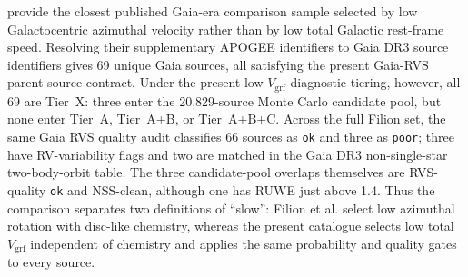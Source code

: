 \documentclass{aa}  %
\newcommand{\vgrf}{\ensuremath{V_{\mathrm{grf}}}\xspace}
\begin{document}
\citet{Filion2025} provide the closest published Gaia-era comparison
sample selected by low Galactocentric azimuthal velocity rather than by
low total Galactic rest-frame speed.  Resolving their supplementary
APOGEE identifiers to Gaia DR3 source identifiers gives 69 unique Gaia
sources, all satisfying the present Gaia-RVS parent-source contract.
Under the present low-\vgrf{} diagnostic tiering, however, all 69 are
Tier~X: three enter the 20{,}829-source Monte Carlo candidate pool, but
none enter Tier~A, Tier~A+B, or Tier~A+B+C.  Across the full Filion set,
the same Gaia RVS quality audit classifies 66 sources as \texttt{ok} and
three as \texttt{poor}; three have RV-variability flags and two are
matched in the Gaia DR3 non-single-star two-body-orbit table.  The three
candidate-pool overlaps themselves are RVS-quality \texttt{ok} and
NSS-clean, although one has RUWE just above 1.4.  Thus the comparison
separates two definitions of ``slow'': Filion et al. select low
azimuthal rotation with disc-like chemistry, whereas the present
catalogue selects low total \vgrf{} independent of chemistry and applies
the same probability and quality gates to every source.



\clearpage


\end{document}
